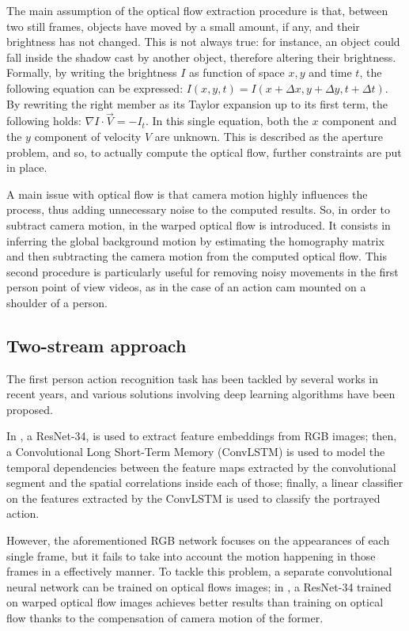 \documentclass[10pt,twocolumn,letterpaper]{article}
\begin{document}
The main assumption of the optical flow extraction procedure is that, between two still frames, objects have moved by a small amount, if any, and their brightness has not changed. This is not always true: for instance, an object could fall inside the shadow cast by another object, therefore altering their brightness. Formally, by writing the brightness $I$ as function of space $x,y$ and time $t$, the following equation can be expressed:
${I(x,y,t) = I(x + \Delta x, y + \Delta y, t + \Delta t)}$. By rewriting the right member as its Taylor expansion up to its first term, the following holds: $\nabla I \cdot \vec{V} = -I_t$. In this single equation, both the $x$ component and the $y$ component of velocity $V$ are unknown. This is described as the aperture problem, and so, to actually compute the optical flow, further constraints are put in place.

A main issue with optical flow is that camera motion highly influences the process, thus adding unnecessary noise to the computed results. So, in order to subtract camera motion, in \cite{wang2013trajectiories} the warped optical flow is introduced. It consists in inferring the global background motion by estimating the homography matrix and then subtracting the camera motion from the computed optical flow. This second procedure is particularly useful for removing noisy movements in the first person point of view videos, as in the case of an action cam mounted on a shoulder of a person.

\subsection{Two-stream approach}
\label{par:Ego-RNN}

The first person action recognition task has been tackled by several works in recent years, and various solutions involving deep learning algorithms have been proposed.

In \cite{Ego-RNN}, a ResNet-34, is used to extract feature embeddings from RGB images; then, a Convolutional Long Short-Term Memory (ConvLSTM) is used to model the temporal dependencies between the feature maps extracted by the convolutional segment and the spatial correlations inside each of those; finally, a linear classifier on the features extracted by the ConvLSTM is used to classify the portrayed action.

However, the aforementioned RGB network focuses on the appearances of each single frame, but it fails to take into account the motion happening in those frames in a effectively manner. To tackle this problem, a separate convolutional neural network can be trained on optical flows images; in \cite{Ego-RNN}, a ResNet-34 trained on warped optical flow images achieves better results than training on optical flow thanks to the compensation of camera motion of the former.
\end{document}
